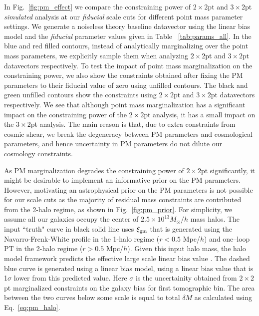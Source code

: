 \documentclass[aps, prd,twocolumn,superscriptaddress,nofootinbib,preprintnumbers]{revtex4-1}
\begin{document}
In Fig.~\ref{fig:pm_effect} we compare the constraining power of $2\times2$pt and $3\times2$pt \textit{simulated} analysis at our \textit{fiducial} scale cuts for different point mass parameter settings. We generate a noiseless theory baseline datavector using the linear bias model and the \textit{fiducial} parameter values given in Table ~\ref{tab:params_all}. In the blue and red filled contours, instead of analytically marginalizing over the point mass parameters, we explicitly sample them when analyzing $2\times 2$pt and $3\times 2$pt datavectors respectively. To test the impact of point mass marginalization on the constraining power, we also show the constraints obtained after fixing the PM parameters to their fiducial value of zero using unfilled contours. The black and green unfilled contours show the constraints using $2\times 2$pt and $3\times 2$pt datavectors respectively. We see that although point mass marginalization has a significant impact on the constraining power of the $2\times2$pt analysis, it has a small impact on the $3\times2$pt analysis. The main reason is that, due to extra constraints from cosmic shear, we break the degeneracy between PM parameters and cosmological parameters, and hence uncertainty in PM parameters do not dilute our cosmology constraints.

As PM marginalization degrades the constraining power of $2\times2$pt significantly, it might be desirable to implement an informative prior on the PM parameters. However, motivating an astrophysical prior on the PM parameters is not possible for our scale cuts as the majority of residual mass constraints are contributed from the 2-halo regime, as shown in Fig.~\ref{fig:pm_prior}. For simplicity, we assume all our galaxies occupy the center of $2.5 \times 10^{13} M_{\odot}/h$ mass halos. The input ``truth" curve in black solid line uses $\xi_{\rm gm}$ that is generated using the Navarro-Frenk-White profile \citep{Navarro_1996} in the 1-halo regime ($r < 0.5$ Mpc/$h$) and one--loop PT in the 2-halo regime ($r > 0.5$ Mpc/$h$). Given this input halo mass, the halo model framework predicts the effective large scale linear bias value \citep{COORAY_2002}. The dashed blue curve is generated using a linear bias model, using a linear bias value that is 1$\sigma$ lower from this predicted value. Here $\sigma$ is the uncertainity obtained from $2\times2$pt marginalized constraints on the galaxy bias for first tomographic bin. The area between the two curves below some scale is equal to total $\delta M$ as calculated using Eq.~\ref{eq:pm_halo}.
\end{document}
